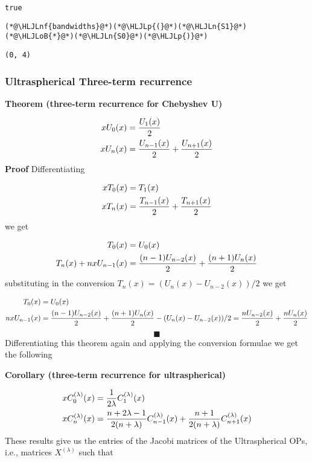 \documentclass[12pt,a4paper]{article}
\newcommand{\HLJLn}[1]{#1}
\newcommand{\HLJLnf}[1]{\textcolor[RGB]{66,102,213}{#1}}
\newcommand{\HLJLoB}[1]{\textcolor[RGB]{102,102,102}{\textbf{#1}}}
\newcommand{\HLJLp}[1]{#1}
\begin{document}
\begin{lstlisting}
true
\end{lstlisting}


\begin{lstlisting}
(*@\HLJLnf{bandwidths}@*)(*@\HLJLp{(}@*)(*@\HLJLn{S1}@*)(*@\HLJLoB{*}@*)(*@\HLJLn{S0}@*)(*@\HLJLp{)}@*)
\end{lstlisting}

\begin{lstlisting}
(0, 4)
\end{lstlisting}


\subsubsection{Ultraspherical Three-term recurrence}
\textbf{Theorem (three-term recurrence for Chebyshev U)}


\begin{align*}
x U_0(x) &= {U_1(x) \over 2} \\
x U_n(x) &= {U_{n-1}(x) \over 2} + {U_{n+1}(x) \over 2}
\end{align*}
\textbf{Proof} Differentiating


\begin{align*}
 x T_0(x) &= T_1(x) \\
x T_n(x)  &=  {T_{n-1}(x) \over 2} + {T_{n+1}(x) \over 2}
\end{align*}
we get


\begin{align*}
  T_0(x) &= U_0(x) \\
 T_n(x) + n x U_{n-1}(x)  &=  {(n-1) U_{n-2}(x) \over 2} + {(n+1) U_n(x) \over 2}
\end{align*}
substituting in the conversion $T_n(x) = (U_n(x) - U_{n-2}(x))/2$ we get


\begin{align*}
  T_0(x) &= U_0(x) \\
 n x U_{n-1}(x)  &=  {(n-1) U_{n-2}(x) \over 2} + {(n+1) U_n(x) \over 2} - (U_n(x) - U_{n-2}(x))/2 = {n U_{n-2}(x) \over 2} + {n U_n(x) \over 2}
\end{align*}
\[
\blacksquare
\]
Differentiating this theorem again and applying the conversion formulae we get the following

\textbf{Corollary (three-term recurrence for ultraspherical)}


\begin{align*}
x C_0^{(\lambda)}(x) &= {1 \over 2\lambda } C_1^{(\lambda)}(x) \\
 x C_n^{(\lambda)}(x) &=  {n+2\lambda-1 \over 2(n+\lambda)} C_{n-1}^{(\lambda)}(x) + {n+1 \over 2(n+\lambda)} C_{n+1}^{(\lambda)}(x)
\end{align*}
These results give us the entries of the Jacobi matrices of the Ultraspherical OPs, i.e., matrices $X^{(\lambda)}$ such that
\end{document}
